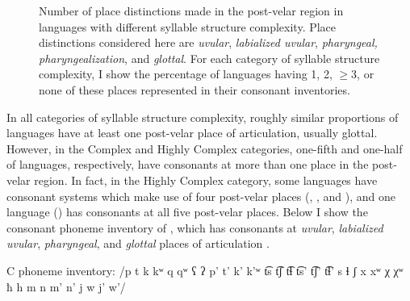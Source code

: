 \begin{figure}
\caption{\label{fig:4.11} Number of place distinctions made in the post-velar region in languages with different syllable structure complexity. Place distinctions considered here are \textit{uvular}, \textit{labialized uvular}, \textit{pharyngeal, pharyngealization}, and \textit{glottal}. For each category of syllable structure complexity, I show the percentage of languages having 1, 2, ${\geq}$3, or none of these places represented in their consonant inventories.}
\end{figure}

  In all categories of syllable structure complexity, roughly similar proportions of languages have at least one post-velar place of articulation, usually glottal. However, in the Complex and Highly Complex categories, one-fifth and one-half of languages, respectively, have consonants at more than one place in the post-velar region. In fact, in the Highly Complex category, some languages have consonant systems which make use of four post-velar places (, , and ), and one language () has consonants at all five post-velar places. Below I show the consonant phoneme inventory of , which has consonants at \textit{uvular}, \textit{labialized uvular}, \textit{pharyngeal}, and \textit{glottal} places of articulation .

\ea\label{ex:4.33}
\begin{Coding}
\item[C phoneme inventory:] /p t k kʷ q qʷ ʕ ʔ p’ t’ k’ k’ʷ t͡s t͡ʃ t͡ɬ t͡s’ t͡ʃ’ t͡ɬ’ s ɬ ʃ x xʷ χ χʷ ħ h m n m’ n’ j w j’ w’/
\end{Coding}
\z

